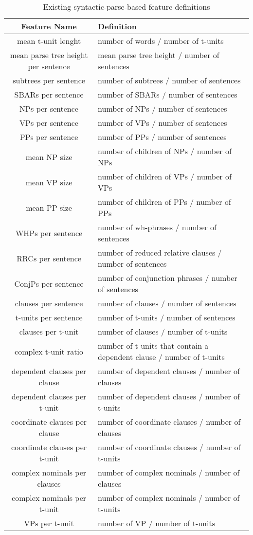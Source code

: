\documentclass[11pt,a4paper]{article}
\theoremstyle{definition}
\begin{document}
\begin{table}
\centering
\begin{tabular}{|c|p{10.5cm}|}
\hline
\textbf{Feature Name} & \textbf{Definition} \\\hline
mean t-unit lenght &number of words / number of t-units \\\hline
mean parse tree height per sentence & mean parse tree height / number of sentences \\\hline
subtrees per sentence & number of subtrees / number of sentences \\\hline
SBARs per sentence & number of SBARs / number of sentences \\\hline
NPs per sentence & number of NPs / number of sentences \\\hline
VPs per sentence & number of VPs / number of sentences \\\hline
PPs per sentence & number of PPs / number of sentences \\\hline
mean NP size & number of children of NPs / number of NPs \\\hline
mean VP size & number of children of VPs / number of VPs \\\hline
mean PP size & number of children of PPs / number of PPs \\\hline
WHPs per sentence & number of wh-phrases / number of sentences \\\hline
RRCs per sentence & number of reduced relative clauses / number of sentences \\\hline
ConjPs per sentence & number of conjunction phrases / number of sentences \\\hline
clauses per sentence & number of clauses / number of sentences \\\hline
t-units per sentence & number of t-units / number of sentences \\\hline
clauses per t-unit & number of clauses / number of t-units \\\hline
complex t-unit ratio & number of t-units that contain a dependent clause / number of t-units \\\hline
dependent clauses per clause & number of dependent clauses / number of clauses \\\hline
dependent clauses per t-unit & number of dependent clauses / number of t-units \\\hline
coordinate clauses per clause & number of coordinate clauses / number of clauses \\\hline
coordinate clauses per t-unit & number of coordinate clauses / number of t-units \\\hline
complex nominals per clauses & number of complex nominals / number of clauses \\\hline
complex nominals per t-unit & number of complex nominals / number of t-units \\\hline
VPs per t-unit & number of VP / number of t-units \\\hline
\end{tabular}
\caption{Existing syntactic-parse-based feature definitions}
\end{table}
\end{document}
